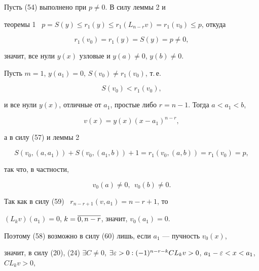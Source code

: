 \begin{pf}


Пусть (54) выполнено при $p\ne 0$. В силу леммы 2 и


теоремы 1 \ $p=S(y)\le r_1(y)\le r_1(L_{n-r}v)=r_1(v_0)\le p$, откуда 


\begin{equation}


r_1(v_0)=r_1(y)=S(y)=p\ne 0,


\end{equation}


значит, все нули $y(x)$ узловые и $y(a)\ne 0$, $y(b)\ne 0$.





Пусть $m=1$, $y(a_1)=0$, $S(v_0)\ne r_1(v_0)$, т.\,е.


\begin{equation}


S(v_0)<r_1(v_0),


\end{equation}


и все нули $y(x)$, отличные от $a_1$, простые либо $r=n-1$. Тогда $a<a_1<b$,


\begin{equation}


v(x)=y(x)(x-a_1)^{n-r},


\end{equation}


а в силу (57) и леммы 2


\begin{equation}


S(v_0,(a,a_1))+S(v_0,(a_1,b))+1=r_1(v_0,(a,b))=r_1(v_0)=p,


\end{equation}


так что, в частности,


\begin{equation}


v_0(a)\ne 0,\ \ v_0(b)\ne 0.


\end{equation}


Так как в силу (59) \ $r_{n-r+1}(v,a_1)=n-r+1$, то


$(L_kv)(a_1)=0$, $k=\overline{0,n-r}$, значит, $v_0(a_1)=0$.


Поэтому (58) возможно в силу (60) лишь, если $a_1$ --- пучность $v_0(x)$,


значит, в силу (20), (24) $\exists C\ne 0$, $\exists\eps>0:


(-1)^{n-r-k}CL_kv>0$, $a_1-\eps<x<a_1$, $CL_kv>0$,



\end{pf}
